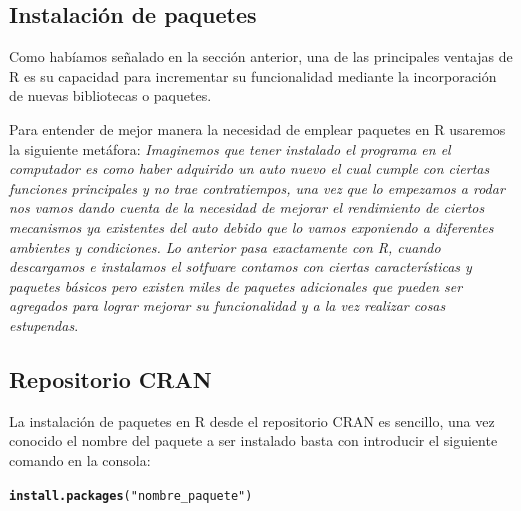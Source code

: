\documentclass[11pt,a4paper,oneside]{book}\usepackage[]{graphicx}\usepackage[]{color}
\makeatletter
\newcommand{\hlstr}[1]{\textcolor[rgb]{0.192,0.494,0.8}{#1}}%
\newcommand{\hlstd}[1]{\textcolor[rgb]{0.345,0.345,0.345}{#1}}%
\newcommand{\hlkwd}[1]{\textcolor[rgb]{0.737,0.353,0.396}{\textbf{#1}}}%
\newenvironment{kframe}{%
 \def\at@end@of@kframe{}%
 \ifinner\ifhmode%
  \def\at@end@of@kframe{\end{minipage}}%
  \begin{minipage}{\columnwidth}%
 \fi\fi%
 \def\FrameCommand##1{\hskip\@totalleftmargin \hskip-\fboxsep
 \colorbox{shadecolor}{##1}\hskip-\fboxsep
     \hskip-\linewidth \hskip-\@totalleftmargin \hskip\columnwidth}%
 \MakeFramed {\advance\hsize-\width
   \@totalleftmargin\z@ \linewidth\hsize
   \@setminipage}}%
 {\par\unskip\endMakeFramed%
 \at@end@of@kframe}
\newenvironment{knitrout}{}{} %
\makeatother
\begin{document}
\begin{itemize}
\section{Instalación de paquetes}

Como habíamos señalado en la sección anterior, una de las principales ventajas de R es su capacidad para incrementar su funcionalidad mediante la incorporación de nuevas bibliotecas o paquetes.\newline

Para entender de mejor manera la necesidad de emplear paquetes en R usaremos la siguiente metáfora: \emph{Imaginemos que tener instalado el programa en el computador es como haber adquirido un auto nuevo el cual cumple con ciertas funciones principales y no trae contratiempos, una vez que lo empezamos a rodar nos vamos dando cuenta de la necesidad de mejorar el rendimiento de ciertos mecanismos ya existentes del auto debido que lo vamos exponiendo a diferentes ambientes y condiciones. Lo anterior pasa exactamente con R, cuando  descargamos e instalamos el sotfware contamos con ciertas características y paquetes básicos pero existen miles de paquetes adicionales que pueden ser agregados para lograr mejorar su funcionalidad y a la vez realizar cosas estupendas}.

\subsection{Repositorio CRAN}

La instalación de paquetes en R desde el repositorio CRAN es sencillo, una vez conocido el nombre del paquete a ser instalado basta con introducir el siguiente comando en la consola:
\begin{knitrout}
\color{fgcolor}\begin{kframe}
\begin{alltt}
\hlkwd{install.packages}\hlstd{(}\hlstr{"nombre_paquete"}\hlstd{)}
\end{alltt}
\end{kframe}
\end{knitrout}


\end{itemize}
\end{document}
